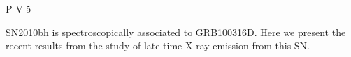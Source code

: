 P-V-5


\bigskip



\bigskip

\noindent SN2010bh is spectroscopically associated to GRB100316D. Here we present the recent results from the study of late-time X-ray emission from this SN.

